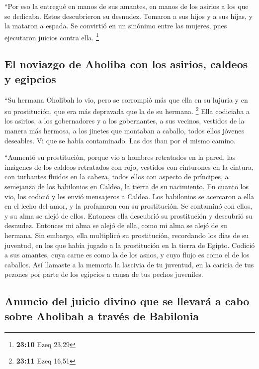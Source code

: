  ``Por eso la entregué en manos de sus amantes, en manos
de los asirios a los que se dedicaba.  Estos descubrieron
su desnudez. Tomaron a sus hijos y a sus hijas, y la mataron a espada.
Se convirtió en un sinónimo entre las mujeres, pues ejecutaron juicios
contra ella. \footnote{\textbf{23:10} Ezeq 23,29}

\hypertarget{el-noviazgo-de-aholiba-con-los-asirios-caldeos-y-egipcios}{%
\subsection{El noviazgo de Aholiba con los asirios, caldeos y
egipcios}\label{el-noviazgo-de-aholiba-con-los-asirios-caldeos-y-egipcios}}

 ``Su hermana Oholibah lo vio, pero se corrompió más que
ella en su lujuria y en su prostitución, que era más depravada que la de
su hermana. \footnote{\textbf{23:11} Ezeq 16,51}  Ella
codiciaba a los asirios, a los gobernadores y a los gobernantes, a sus
vecinos, vestidos de la manera más hermosa, a los jinetes que montaban a
caballo, todos ellos jóvenes deseables.  Vi que se había
contaminado. Las dos iban por el mismo camino.

 ``Aumentó su prostitución, porque vio a hombres
retratados en la pared, las imágenes de los caldeos retratados con rojo,
 vestidos con cinturones en la cintura, con turbantes
fluidos en la cabeza, todos ellos con aspecto de príncipes, a semejanza
de los babilonios en Caldea, la tierra de su nacimiento. 
En cuanto los vio, los codició y les envió mensajeros a Caldea.
 Los babilonios se acercaron a ella en el lecho del amor,
y la profanaron con su prostitución. Se contaminó con ellos, y su alma
se alejó de ellos.  Entonces ella descubrió su
prostitución y descubrió su desnudez. Entonces mi alma se alejó de ella,
como mi alma se alejó de su hermana.  Sin embargo, ella
multiplicó su prostitución, recordando los días de su juventud, en los
que había jugado a la prostitución en la tierra de Egipto.
 Codició a sus amantes, cuya carne es como la de los
asnos, y cuyo flujo es como el de los caballos.  Así
llamaste a la memoria la lascivia de tu juventud, en la caricia de tus
pezones por parte de los egipcios a causa de tus pechos juveniles.

\hypertarget{anuncio-del-juicio-divino-que-se-llevaruxe1-a-cabo-sobre-aholibah-a-travuxe9s-de-babilonia}{%
\subsection{Anuncio del juicio divino que se llevará a cabo sobre
Aholibah a través de
Babilonia}\label{anuncio-del-juicio-divino-que-se-llevaruxe1-a-cabo-sobre-aholibah-a-travuxe9s-de-babilonia}}


